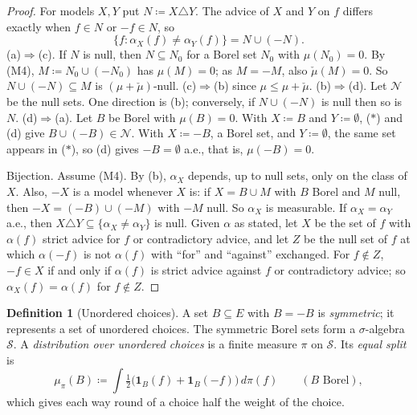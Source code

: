 \documentclass[11pt]{article}
\newcommand{\one}{\mathbf{1}}
\theoremstyle{plain}
\theoremstyle{definition}
\newtheorem{definition}[theorem]{Definition}
\begin{document}
\begin{proof}
For models $X,Y$ put $N\coloneqq X\triangle Y$. The advice of $X$ and $Y$ on $f$ differs exactly
when $f\in N$ or $-f\in N$, so
\[
  \{f:\alpha_X(f)\ne\alpha_Y(f)\}=N\cup(-N). \tag{$\ast$}
\]
(a)$\Rightarrow$(c). If $N$ is null, then $N\subseteq N_0$ for a Borel set $N_0$ with
$\mu(N_0)=0$. By (M4), $M\coloneqq N_0\cup(-N_0)$ has $\mu(M)=0$; as $M=-M$, also
$\check\mu(M)=0$. So $N\cup(-N)\subseteq M$ is $(\mu+\check\mu)$-null.
(c)$\Rightarrow$(b) since $\mu\le\mu+\check\mu$.
(b)$\Rightarrow$(d). Let $\mathcal N$ be the null sets. One direction is (b); conversely, if
$N\cup(-N)$ is null then so is $N$.
(d)$\Rightarrow$(a). Let $B$ be Borel with $\mu(B)=0$. With $X\coloneqq B$ and $Y\coloneqq
\emptyset$, ($\ast$) and (d) give $B\cup(-B)\in\mathcal N$. With $X\coloneqq-B$, a Borel set,
and $Y\coloneqq\emptyset$, the same set appears in ($\ast$), so (d) gives $-B=\emptyset$
a.e., that is, $\mu(-B)=0$.

Bijection. Assume (M4). By (b), $\alpha_X$ depends, up to null sets, only on the class of
$X$. Also, $-X$ is a model whenever $X$ is: if $X=B\cup M$ with $B$ Borel and $M$
null, then $-X=(-B)\cup(-M)$ with $-M$ null. So $\alpha_X$ is measurable. If $\alpha_X=\alpha_Y$
a.e., then $X\triangle Y\subseteq\{\alpha_X\ne\alpha_Y\}$ is null. Given $\alpha$ as stated,
let $X$ be the set of $f$ with $\alpha(f)$ strict advice for $f$ or contradictory advice, and
let $Z$ be the null set of $f$ at which $\alpha(-f)$ is not $\alpha(f)$ with ``for'' and
``against'' exchanged. For $f\notin Z$, $-f\in X$ if and only if $\alpha(f)$ is strict advice
against $f$ or contradictory advice; so $\alpha_X(f)=\alpha(f)$ for $f\notin Z$.
\end{proof}

\begin{definition}[Unordered choices]\label{def:unordered}
A set $B\subseteq E$ with $B=-B$ is \emph{symmetric}; it represents a set of unordered choices.
The symmetric Borel sets form a $\sigma$-algebra $\mathcal S$. A \emph{distribution over
unordered choices} is a finite measure $\pi$ on $\mathcal S$. Its \emph{equal split} is
\[
  \mu_\pi(B)\coloneqq\int\tfrac12\bigl(\one_B(f)+\one_B(-f)\bigr)\,d\pi(f)\qquad(B\text{ Borel}),
\]
which gives each way round of a choice half the weight of the choice.
\end{definition}
\end{document}
